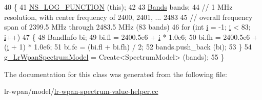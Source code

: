 \begin{DoxyCode}
40   \{
41     \hyperlink{log-macros-disabled_8h_a90b90d5bad1f39cb1b64923ea94c0761}{NS\_LOG\_FUNCTION} (\textcolor{keyword}{this});
42 
43     \hyperlink{namespacens3_a46ac9188e5cf43bd5292f7b67451246e}{Bands} bands;
44     \textcolor{comment}{// 1 MHz resolution, with center frequency of 2400, 2401, ... 2483}
45     \textcolor{comment}{// overall frequency span of 2399.5 MHz through 2483.5 MHz (83 bands)}
46     \textcolor{keywordflow}{for} (\textcolor{keywordtype}{int} \hyperlink{bernuolliDistribution_8m_a6f6ccfcf58b31cb6412107d9d5281426}{i} = -1; \hyperlink{bernuolliDistribution_8m_a6f6ccfcf58b31cb6412107d9d5281426}{i} < 83; \hyperlink{bernuolliDistribution_8m_a6f6ccfcf58b31cb6412107d9d5281426}{i}++)
47       \{
48         BandInfo bi;
49         bi.fl = 2400.5e6 + \hyperlink{bernuolliDistribution_8m_a6f6ccfcf58b31cb6412107d9d5281426}{i} * 1.0e6;
50         bi.fh = 2400.5e6 + (\hyperlink{bernuolliDistribution_8m_a6f6ccfcf58b31cb6412107d9d5281426}{i} + 1) * 1.0e6;
51         bi.fc = (bi.fl +  bi.fh) / 2;
52         bands.push\_back (bi);
53       \}
54     \hyperlink{namespacens3_a42737ccd2a2a0c75325fbf6abfffda10}{g\_LrWpanSpectrumModel} = Create<SpectrumModel> (bands);
55   \}
\end{DoxyCode}


The documentation for this class was generated from the following file\+:\begin{DoxyCompactItemize}
\item 
lr-\/wpan/model/\hyperlink{lr-wpan-spectrum-value-helper_8cc}{lr-\/wpan-\/spectrum-\/value-\/helper.\+cc}\end{DoxyCompactItemize}
